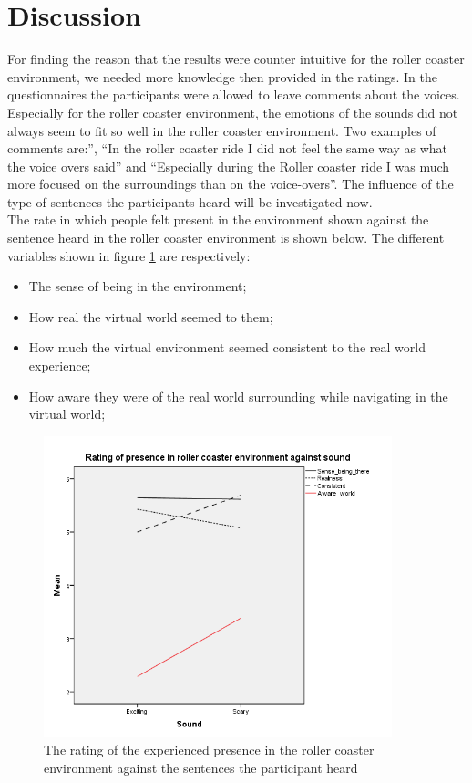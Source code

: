 \documentclass[Results.tex]{subfiles}
\begin{document}
\section{Discussion}
For finding the reason that the results were counter intuitive for the roller coaster environment, we needed more knowledge then provided in the ratings. In the questionnaires the participants were allowed to leave comments about the voices. Especially for the roller coaster environment, the emotions of the sounds did not always seem to fit so well in the roller coaster environment. Two examples of comments are:”, “In the roller coaster ride I did not feel the same way as what the voice overs said” and “Especially during the Roller coaster ride I was much more focused on the surroundings than on the voice-overs”. The influence of the type of sentences the participants heard will be investigated now. \\

The rate in which people felt present in the environment shown against the sentence heard in the roller coaster environment is shown below. The different variables shown in figure \ref{fig:Ratings_presence_RC} are respectively: 

\begin{itemize}
	\item The sense of being in the environment;
  \item How real the virtual world seemed to them;
  \item How much the virtual environment seemed consistent to the real world experience;
  \item How aware they were of the real world surrounding while navigating in the virtual world;
\end{itemize}

\begin{figure}[H]
	\centering
		\includegraphics[width=0.90\textwidth]{Section_1/Figures/Ratings_presence_RC.png}
	\caption{The rating of the experienced presence in the roller coaster environment against the sentences the participant heard}
	\label{fig:Ratings_presence_RC}
\end{figure}
\end{document}
